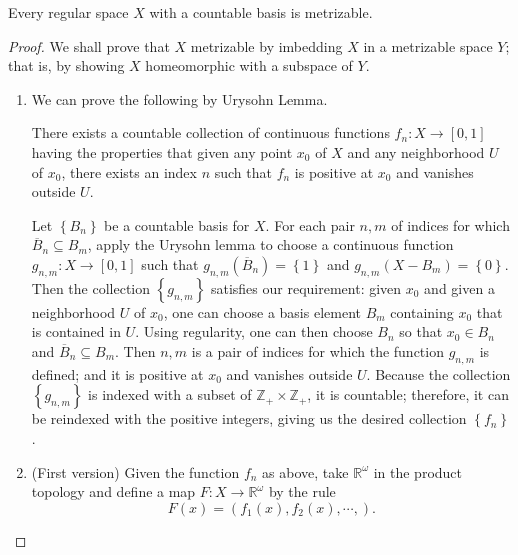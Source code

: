\begin{theorem}
  Every regular space \( X \) with a countable basis is metrizable.
\end{theorem}
\begin{proof}
  We shall prove that \( X \) metrizable by imbedding \( X \) in a metrizable space \( Y \); that is, by showing \( X \) homeomorphic with a subspace of \( Y \).
  \begin{enumerate}
    \item We can prove the following by Urysohn Lemma.
      \begin{claim}
        There exists a countable collection of continuous functions \( f_n: X \to [0, 1] \) having the properties that given any point \( x_0 \) of \( X \) and any neighborhood \( U \) of \( x_0 \), there exists an index \( n \) such that \( f_n \) is positive at \( x_0 \) and vanishes outside \( U \).
      \end{claim}
      \begin{claimproof}
        Let \( \left\lbrace B_n \right\rbrace \) be a countable basis for \( X \).
        For each pair \( n, m \) of indices for which \( \overline{B}_n \subseteq B_m \), apply the Urysohn lemma to choose a continuous function \( g_{n, m}: X \to [0, 1] \) such that \( g_{n, m} (\overline{B}_n) = \left\lbrace 1 \right\rbrace \) and \( g_{n, m}(X - B_m) = \left\lbrace 0 \right\rbrace \).
        Then the collection \( \left\lbrace g_{n, m} \right\rbrace \) satisfies our requirement: given \( x_0 \) and given a neighborhood \( U \) of \( x_0 \), one can choose a basis element \( B_m \) containing \( x_0 \) that is contained in \( U \).
        Using regularity, one can then choose \( B_n \) so that \( x_0 \in B_n \) and \( \overline{B}_n \subseteq B_m \).
        Then \( n, m \) is a pair of indices for which the function \( g_{n, m} \) is defined; and it is positive at \( x_0 \) and vanishes outside \( U \).
        Because the collection \( \left\lbrace g_{n, m} \right\rbrace \) is indexed with a subset of \( \mathbb{Z}_+ \times \mathbb{Z}_+ \), it is countable; therefore, it can be reindexed with the positive integers, giving us the desired collection \( \left\lbrace f_n \right\rbrace \).
      \end{claimproof}
    \item (First version) Given the function \( f_n \) as above, take \( \mathbb{R}^\omega \) in the product topology and define a map \( F: X \to \mathbb{R}^\omega \) by the rule
      \[
        F(x) = (f_1(x), f_2(x), \cdots,).
\]
\end{enumerate}
\end{proof}
